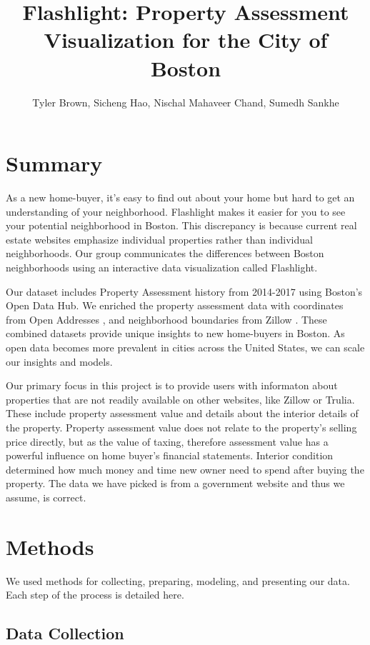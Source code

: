 \documentclass[12pt]{article}
\title{\textbf{Flashlight}: Property Assessment Visualization for the City of Boston}
\author{Tyler Brown, Sicheng Hao, Nischal Mahaveer Chand, Sumedh Sankhe}
\date{ }
\begin{document}
\maketitle

\section*{Summary}

As a new home-buyer, it's easy to find out about your home
but hard to get an understanding of your neighborhood. Flashlight
makes it easier for you to see your potential neighborhood in Boston.
This discrepancy is because current real estate websites emphasize
individual properties rather than individual neighborhoods. Our group
communicates the differences between Boston neighborhoods using an
interactive data visualization called Flashlight.

Our dataset includes Property Assessment history from 2014-2017
\cite{Property49:online} using Boston's Open Data Hub. We enriched the 
property assessment data with coordinates from Open Addresses
\cite{OpenAddr24:online}, and neighborhood boundaries from Zillow
\cite{ZillowNe81:online}. These combined datasets provide unique
insights to new home-buyers in Boston. As open data becomes more
prevalent in cities across the United States, we can scale our insights
and models.

Our primary focus in this project is to provide users with informaton 
about properties that are not readily available on other websites, like 
Zillow or Trulia. These include property assessment value and details
about the interior details of the property. Property assessment value 
does not relate to the property's selling price directly, but as the 
value of taxing, therefore assessment value has a powerful influence 
on home buyer's financial statements. Interior condition determined 
how much money and time new owner need to spend after buying the 
property. The data we have picked is from a government website and thus
we assume, is correct.

\section*{Methods}

We used methods for collecting, preparing, modeling, and presenting
our data. Each step of the process is detailed here.

\subsection{Data Collection}
\end{document}
